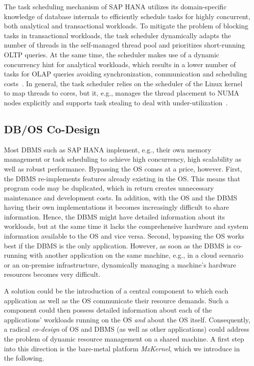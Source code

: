 \documentclass[11pt,dvipdfm]{article}
\begin{document}
The task scheduling mechanism of SAP HANA utilizes its domain-specific knowledge of database internals to efficiently schedule tasks for highly concurrent, both analytical and transactional workloads.
To mitigate the problem of blocking tasks in transactional workloads, the task scheduler dynamically adapts the number of threads in the self-managed thread pool and prioritizes short-running OLTP queries.
At the same time, the scheduler makes use of a dynamic concurrency hint for analytical workloads, which results in a lower number of tasks for OLAP queries avoiding synchronization, communication and scheduling costs~\cite{nollhrm19:PsaroudakisSMA13}.
In general, the task scheduler relies on the scheduler of the Linux kernel to map threads to cores, but it, e.g., manages the thread placement to NUMA nodes explicitly and supports task stealing to deal with under-utilization~\cite{nollhrm19:Psaroudakis:2016:AND:3015274.3015275}.





\subsection{DB/OS Co-Design}
Most DBMS such as SAP HANA implement, e.g., their own memory management or task scheduling to achieve high concurrency, high scalability as well as robust performance.
Bypassing the OS comes at a price, however.
First, the DBMS re-implements features already existing in the OS.
This means that program code may be duplicated, which in return creates unnecessary maintenance and development costs.
In addition, with the OS and the DBMS having their own implementations it becomes increasingly difficult to share information.
Hence, the DBMS might have detailed information about its workloads, but at the same time it lacks the comprehensive hardware and system information available to the OS and vice versa.
Second, bypassing the OS works best if the DBMS is the only application.
However, as soon as the DBMS is co-running with another application on the same machine, e.g., in a cloud scenario or an on-premise infrastructure, dynamically managing a machine's hardware resources becomes very difficult.

A solution could be the introduction of a central component to which each application as well as the OS communicate their resource demands.
Such a component could then possess detailed information about each of the applications' workloads running on the OS \emph{and} about the OS itself.
Consequently, a radical \emph{co-design} of OS and DBMS (as well as other applications) could address the problem of dynamic resource management on a shared machine.
A first step into this direction is the bare-metal platform \emph{MxKernel}, which we introduce in the following.
\end{document}
